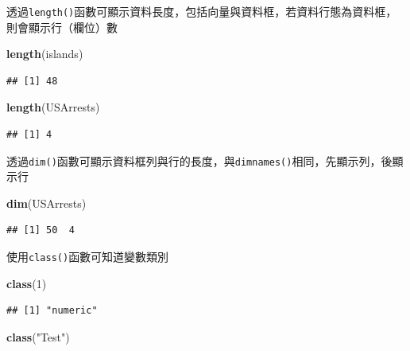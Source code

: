 \documentclass[]{book}
\newenvironment{Shaded}{\begin{snugshade}}{\end{snugshade}}
\newcommand{\KeywordTok}[1]{\textcolor[rgb]{0.13,0.29,0.53}{\textbf{{#1}}}}
\newcommand{\DecValTok}[1]{\textcolor[rgb]{0.00,0.00,0.81}{{#1}}}
\newcommand{\StringTok}[1]{\textcolor[rgb]{0.31,0.60,0.02}{{#1}}}
\newcommand{\NormalTok}[1]{{#1}}
\theoremstyle{definition}
\theoremstyle{definition}
\theoremstyle{remark}
\begin{document}
透過\texttt{length()}函數可顯示資料長度，包括向量與資料框，若資料行態為資料框，則會顯示行（欄位）數

\begin{Shaded}
\begin{Highlighting}[]
\KeywordTok{length}\NormalTok{(islands) }
\end{Highlighting}
\end{Shaded}

\begin{verbatim}
## [1] 48
\end{verbatim}

\begin{Shaded}
\begin{Highlighting}[]
\KeywordTok{length}\NormalTok{(USArrests) }
\end{Highlighting}
\end{Shaded}

\begin{verbatim}
## [1] 4
\end{verbatim}

透過\texttt{dim()}函數可顯示資料框列與行的長度，與\texttt{dimnames()}相同，先顯示列，後顯示行

\begin{Shaded}
\begin{Highlighting}[]
\KeywordTok{dim}\NormalTok{(USArrests) }
\end{Highlighting}
\end{Shaded}

\begin{verbatim}
## [1] 50  4
\end{verbatim}

使用\texttt{class()}函數可知道變數類別

\begin{Shaded}
\begin{Highlighting}[]
\KeywordTok{class}\NormalTok{(}\DecValTok{1}\NormalTok{)}
\end{Highlighting}
\end{Shaded}

\begin{verbatim}
## [1] "numeric"
\end{verbatim}

\begin{Shaded}
\begin{Highlighting}[]
\KeywordTok{class}\NormalTok{(}\StringTok{"Test"}\NormalTok{)}
\end{Highlighting}
\end{Shaded}
\end{document}
